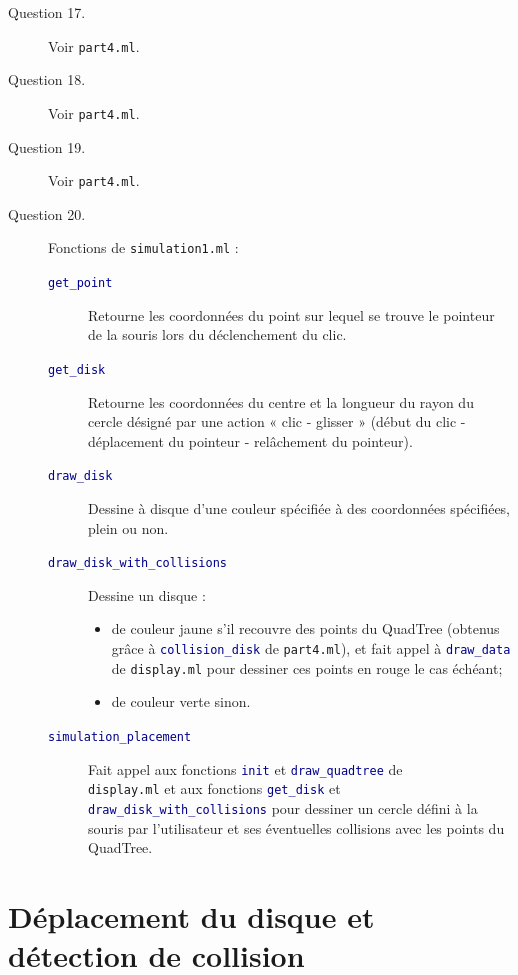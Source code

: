 \documentclass[11pt]{scrartcl}
\newcommand{\funname}[1]{\texttt{\textcolor{darkblue}{#1}}}
\newcommand{\filename}[1]{\texttt{\textcolor{darkbrown}{#1}}}
\begin{document}
\begin{description}
\item[Question 17.] Voir \filename{part4.ml}.

\item[Question 18.] Voir \filename{part4.ml}.

\item[Question 19.] Voir \filename{part4.ml}.

\item[Question 20.] Fonctions de \filename{simulation1.ml} :
\begin{description}
\item[\funname{get_point}] Retourne les coordonnées du point sur lequel se trouve le pointeur de la souris lors du déclenchement du clic.
\item[\funname{get_disk}] Retourne les coordonnées du centre et la longueur du rayon du cercle désigné par une action « clic - glisser » (début du clic - déplacement du pointeur - relâchement du pointeur).
\item[\funname{draw_disk}] Dessine à disque d'une couleur spécifiée à des coordonnées spécifiées, plein ou non.
\item[\funname{draw_disk_with_collisions}] Dessine un disque :
\begin{itemize}
\item de couleur jaune s'il recouvre des points du QuadTree (obtenus grâce à \funname{collision_disk} de \filename{part4.ml}), et fait appel à \funname{draw_data} de \filename{display.ml} pour dessiner ces points en rouge le cas échéant;
\item de couleur verte sinon.
\end{itemize}
\item[\funname{simulation_placement}] Fait appel aux fonctions \funname{init} et \funname{draw_quadtree} de \\ \filename{display.ml} et aux fonctions \funname{get_disk} et \funname{draw_disk_with_collisions} pour dessiner un cercle défini à la souris par l'utilisateur et ses éventuelles collisions avec les points du QuadTree.
\end{description}
\end{description}

\section{Déplacement du disque et détection de collision}
\end{document}
